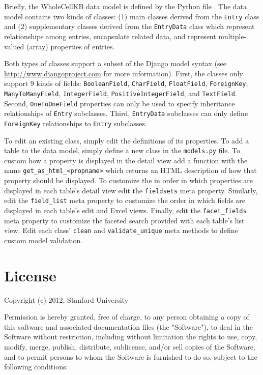 \documentclass[twoside]{book}
\begin{document}
Briefly, the WholeCellKB data model is defined by the Python file . The data model contains two kinds of classes: (1) main classes derived from the \texttt{Entry} class and (2) supplementary classes derived from the \texttt{EntryData} class which represent relationships among entries, encapsulate related data, and represent multiple-valued (array) properties of entries.

Both types of classes support a subset of the Django model syntax (see \url{http://www.djangoproject.com} for more information). First, the classes only support 9 kinds of fields: \texttt{BooleanField}, \texttt{CharField}, \texttt{FloatField}, \texttt{ForeignKey}, \texttt{ManyToManyField}, \texttt{IntegerField}, \texttt{Pos\-i\-tive\-In\-te\-ger\-Field}, and \texttt{TextField}. Second, \texttt{OneToOneField} properties can only be used to specify inheritance relationships of \texttt{Entry} subclasses. Third, \texttt{EntryData} subclasses can only define \texttt{ForeignKey} relationships to \texttt{Entry} subclasses.

To edit an existing class, simply edit the definitions of its properties. To add a table to the data model, simply define a new class in the \texttt{models.py} file. To custom how a property is displayed in the detail view add a function with the name \texttt{get\_as\_html\_<propname>} which returns an HTML description of how that property should be displayed. To customize the in order in which properties are displayed in each table's detail view edit the \texttt{fieldsets} meta property. Similarly, edit the \texttt{field\_list} meta property to customize the order in which fields are displayed in each table's edit and Excel views. Finally, edit the \texttt{facet\_fields} meta property to customize the faceted search provided with each table's list view. Edit each class' \texttt{clean} and \texttt{validate\_unique} meta methods to define custom model validation.

\appendix


\chapter{License}
Copyright (c) 2012, Stanford University

Permission is hereby granted, free of charge, to any person obtaining a copy of this software and associated documentation files (the "Software"), to deal in the Software without restriction, including without limitation the rights to use, copy, modify, merge, publish, distribute, sublicense, and/or sell copies of the Software, and to permit persons to whom the Software is furnished to do so, subject to the following conditions:
\end{document}
